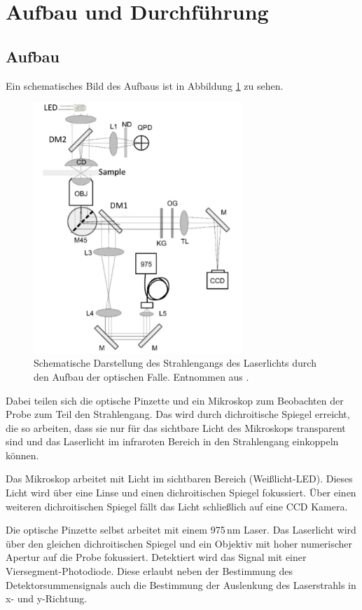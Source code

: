 \newpage
\section{Aufbau und Durchführung}
\subsection{Aufbau}
Ein schematisches Bild des Aufbaus ist in Abbildung \ref{fig:Aufbau} zu sehen.
\begin{figure}[H]
    \centering\captionsetup{format=plain}
    \includegraphics[width=0.7\textwidth]{Bilder/OP_Schema.png}
    \caption{Schematische Darstellung des Strahlengangs des Laserlichts durch den Aufbau der optischen Falle. Entnommen aus \cite{ref10}.}
    \label{fig:Aufbau}
\end{figure}
Dabei teilen sich die optische Pinzette und ein Mikroskop zum Beobachten der Probe 
zum Teil den Strahlengang. Das wird durch 
dichroitische Spiegel erreicht, die so arbeiten, dass sie  nur für das sichtbare Licht des
Mikroskops transparent sind und das Laserlicht im infraroten Bereich in den Strahlengang einkoppeln können.


Das Mikroskop arbeitet mit Licht im sichtbaren Bereich (Weißlicht-LED).
Dieses Licht wird über eine Linse und einen dichroitischen Spiegel fokussiert.
Über einen weiteren dichroitischen Spiegel fällt das Licht schließlich auf eine CCD Kamera.


Die optische Pinzette selbst arbeitet mit einem 975$\,$nm Laser.
Das Laserlicht wird über den gleichen dichroitischen Spiegel und ein 
Objektiv mit hoher numerischer Apertur auf die Probe fokussiert.
Detektiert wird das Signal mit einer Viersegment-Photodiode. 
Diese erlaubt neben der Bestimmung des Detektorsummensignals auch die Bestimmung der Auslenkung des Laserstrahls in x- und y-Richtung.

